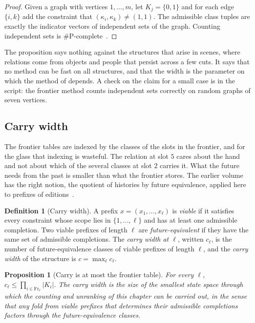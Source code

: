 \documentclass[11pt,twoside,openright]{book}
\theoremstyle{plain}
\newtheorem{proposition}[theorem]{Proposition}
\theoremstyle{definition}
\newtheorem{definition}[theorem]{Definition}
\theoremstyle{remark}
\newcommand{\Fr}{\mathrm{Fr}}
\begin{document}
\begin{proof}
Given a graph with vertices $1,\dots,m$, let $K_j=\{0,1\}$ and for each edge $\{i,k\}$ add the constraint that $(\kappa_i,\kappa_k)\ne(1,1)$. The admissible class tuples are exactly the indicator vectors of independent sets of the graph. Counting independent sets is $\#$P-complete~\cite{provanball1983}.
\end{proof}

The proposition says nothing against the structures that arise in scenes, where relations come from objects and people that persist across a few cuts. It says that no method can be fast on all structures, and that the width is the parameter on which the method of  depends. A check on the claim for a small case is in the script: the frontier method counts independent sets correctly on random graphs of seven vertices.

\subsection{Carry width}

The frontier tables are indexed by the classes of the slots in the frontier, and for the glass that indexing is wasteful. The relation at slot $5$ cares about the hand and not about which of the several classes at slot $2$ carries it. What the future needs from the past is smaller than what the frontier stores. The earlier volume has the right notion, the quotient of histories by future equivalence, applied here to prefixes of editions~\cite{flyxion2026gf,hopcroft2006}.

\begin{definition}[Carry width]\label{def:carry}
A prefix $x=(x_1,\dots,x_\ell)$ is \emph{viable} if it satisfies every constraint whose scope lies in $\{1,\dots,\ell\}$ and has at least one admissible completion. Two viable prefixes of length $\ell$ are \emph{future-equivalent} if they have the same set of admissible completions. The \emph{carry width at $\ell$}, written $c_\ell$, is the number of future-equivalence classes of viable prefixes of length $\ell$, and the \emph{carry width} of the structure is $c=\max_\ell c_\ell$.
\end{definition}

\begin{proposition}[Carry is at most the frontier table]\label{prop:carryfront}
For every $\ell$, $c_\ell\le\prod_{i\in\Fr_\ell}\lvert K_i\rvert$. The carry width is the size of the smallest state space through which the counting and unranking of this chapter can be carried out, in the sense that any fold from viable prefixes that determines their admissible completions factors through the future-equivalence classes.
\end{proposition}
\end{document}
